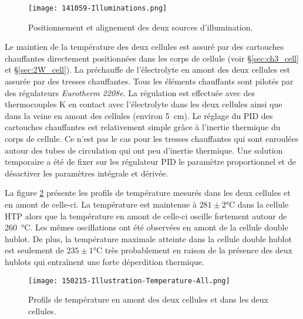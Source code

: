 \begin{refsection}
    \begin{figure}[H]
        \centering
        \texttt{[image: 141059-Illuminations.png]}
        \caption{Positionnement et alignement des deux sources d'illumination.}
        \label{fig:ch3_sources_alignment}
    \end{figure}

    Le maintien de la température des deux cellules est assuré par des cartouches chauffantes directement positionnées
    dans les corps de cellule (voir \S\ref{sec:ch3_cell} et \S\ref{sec:2W_cell}).
    La préchauffe de l'électrolyte en amont des deux cellules est assurée par des tresses
    chauffantes.
    Tous les éléments chauffants sont pilotés par des régulateurs \emph{Eurotherm 2208e}. La régulation est
    effectuée avec des thermocouples K en contact avec l'électrolyte dans les deux cellules ainsi que dans la veine en amont des
    cellules (environ \SI{5}{\centi\meter}).
    Le réglage du PID des cartouches chauffantes est relativement simple grâce à l'inertie thermique du corps de
    cellule. Ce n'est pas le cas pour les tresses chauffantes qui sont enroulées autour des
    tubes de circulation qui ont peu d'inertie thermique. Une solution temporaire a été de fixer sur les régulateur PID
    le paramètre proportionnel
    et de désactiver les paramètres intégrale et dérivée. 
    
    La figure \ref{fig:ch3_temperature_management} présente les
    profils de température mesurés dans les deux cellules et en amont de celle-ci. La température est maintenue à
    $281 \pm 2 \si{\degreeCelsius}$ dans la cellule HTP alors que la température en amont de celle-ci oscille fortement autour
    de \SI{260}{\degreeCelsius}. Les mêmes oscillations ont été observées en amont de la cellule double hublot. De plus, la
    température maximale atteinte dans la cellule double hublot est seulement de $235 \pm 1 \si{\degreeCelsius}$ très
    probablement en raison de la présence des deux hublots qui entraînent une forte déperdition thermique.
    
    \begin{figure}[H]
        \centering
        \texttt{[image: 150215-Illustration-Temperature-All.png]}
        \caption{Profils de température en amont des deux cellules et dans les deux cellules.}
        \label{fig:ch3_temperature_management}
    \end{figure}



\end{refsection}
